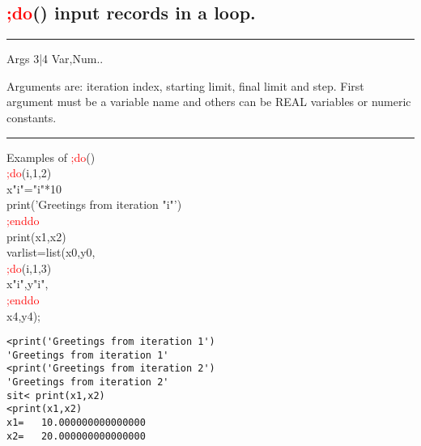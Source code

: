 \subsection{\textcolor{Red}{;do}() input records in a loop.}
\label{inpudo}
\vspace{0.3cm}
\hrule
\vspace{0.3cm}
\noindent Args \tabto{3cm} 3|4 \tabto{5cm}  Var,Num.. \tabto{7cm}
\begin{changemargin}{3cm}{0cm}
\noindent Arguments are: iteration index, starting limit,
final limit and step. First argument must be a variable name and others
can be REAL variables or numeric constants.
\end {changemargin}
\hrule
\vspace{0.2cm}
\begin{example}[inpudoex]Examples of \textcolor{Red}{;do}()\\
\label{inpudoex}
\textcolor{Red}{;do}(i,1,2)\\
x"i"="i"*10\\
\textcolor{VioletRed}{print}('Greetings from iteration "i"')\\
\textcolor{Red}{;enddo}\\
\textcolor{VioletRed}{print}(x1,x2)\\
varlist=\textcolor{VioletRed}{list}(x0,y0,\\
\textcolor{Red}{;do}(i,1,3)\\
x"i",y"i",\\
\textcolor{Red}{;enddo}\\
x4,y4);
\end{example}

\color{Green}
\begin{verbatim}
<print('Greetings from iteration 1')
'Greetings from iteration 1'
<print('Greetings from iteration 2')
'Greetings from iteration 2'
sit< print(x1,x2)
<print(x1,x2)
x1=   10.000000000000000
x2=   20.000000000000000
\end{verbatim}
\color{Black}
